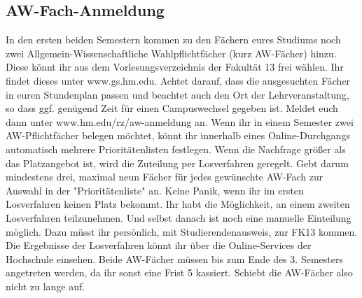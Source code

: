 \subsection{AW-Fach-Anmeldung}
In den ersten beiden Semestern kommen zu den Fächern eures Studiums 
noch zwei Allgemein-Wissenschaftliche Wahlpflichtfächer (kurz AW-Fächer) hinzu. Diese könnt ihr aus dem Vorlesungsverzeichnis der Fakultät 13 frei wählen. Ihr findet dieses unter www.gs.hm.edu. Achtet darauf, dass die ausgesuchten Fächer in euren Stundenplan passen und beachtet auch den Ort der Lehrveranstaltung, so dass ggf. genügend Zeit für einen Campuswechsel gegeben ist. 
Meldet euch dann unter www.hm.edu/rz/aw-anmeldung an. 
Wenn ihr in einem Semester zwei AW-Pflichtfächer belegen möchtet, könnt ihr innerhalb eines Online-Durchgangs automatisch mehrere Prioritätenlisten festlegen. Wenn die Nachfrage größer als das Platzangebot ist, wird die Zuteilung per Losverfahren geregelt. Gebt darum mindestens drei, maximal neun Fächer für jedes gewünschte AW-Fach zur Auswahl in der "Prioritätenliste" an. Keine Panik, wenn ihr im ersten Losverfahren keinen Platz bekommt. Ihr habt die Möglichkeit, an einem zweiten Losverfahren teilzunehmen. Und selbst danach ist noch eine manuelle Einteilung möglich. Dazu müsst ihr persönlich, mit Studierendenausweis, zur FK13 kommen. 
Die Ergebnisse der Losverfahren könnt ihr über die Online-Services der Hochschule einsehen. 
Beide AW-Fächer müssen bis zum Ende des 3. Semesters angetreten werden, da ihr sonst eine Frist 5 kassiert. Schiebt die AW-Fächer also nicht zu lange auf. 